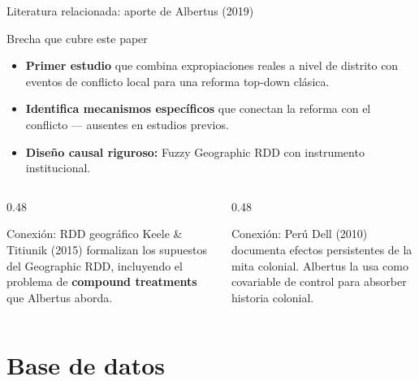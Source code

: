 \documentclass[aspectratio=169,t]{beamer}
\begin{document}
\begin{frame}{Literatura relacionada: aporte de Albertus (2019)}
\begin{block}{Brecha que cubre este paper}
\small\begin{itemize}
  \item \textbf{Primer estudio} que combina expropiaciones
        reales a nivel de distrito con eventos de conflicto
        local para una reforma top-down cl\'asica.
  \item \textbf{Identifica mecanismos espec\'ificos} que
        conectan la reforma con el conflicto ---
        ausentes en estudios previos.
  \item \textbf{Dise\~no causal riguroso:}
        Fuzzy Geographic RDD con instrumento institucional.
\end{itemize}
\end{block}
\vspace{0.2cm}
\begin{columns}[T]
  \begin{column}{0.48\textwidth}
    \begin{alertblock}{\small Conexi\'on: RDD geogr\'afico}
    \small Keele \& Titiunik (2015) formalizan los supuestos
    del Geographic RDD, incluyendo el problema de
    \textbf{compound treatments} que Albertus aborda.
    \end{alertblock}
  \end{column}
  \begin{column}{0.48\textwidth}
    \begin{alertblock}{\small Conexi\'on: Per\'u}
    \small Dell (2010) documenta efectos persistentes
    de la mita colonial. Albertus la usa como
    covariable de control para absorber historia colonial.
    \end{alertblock}
  \end{column}
\end{columns}
\end{frame}

\section{Base de datos}
\end{document}
